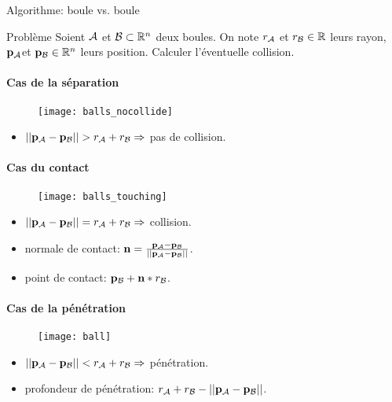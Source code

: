 \begin{frame}{Algorithme: boule vs. boule}
     {
        \begin{block}{Problème}
            Soient $\mathcal{A}$ et $\mathcal{B} \subset \mathbb{R}^n$ deux boules.
            On note $r_{\mathcal{A}}$ et $r_{\mathcal{B}} \in \mathbb{R}$ leurs rayon, ${\bf p_\mathcal{A}}$et ${\bf p_\mathcal{B}} \in
            \mathbb{R}^n$ leurs position.  Calculer l’éventuelle collision.
        \end{block}
    }
     {
     {
        \framesubtitle{Cas de la séparation}
        \begin{figure}[h]
            \texttt{[image: balls\_nocollide]}
        \end{figure}
        \begin{itemize}
            \item $|| {\bf p_\mathcal{A}} - {\bf p_\mathcal{B}} || > r_{\mathcal{A}} + r_{\mathcal{B}} \Rightarrow $ pas de collision.
        \end{itemize}
    }
     {
        \framesubtitle{Cas du contact}
        \begin{figure}[h]
            \texttt{[image: balls\_touching]}
        \end{figure}
        \begin{itemize}
            \item $|| {\bf p_\mathcal{A}} - {\bf p_\mathcal{B}} || = r_{\mathcal{A}} + r_{\mathcal{B}} \Rightarrow $ collision.
            \item normale de contact: ${\bf n} = \frac{{\bf p_\mathcal{A}} - {\bf p_\mathcal{B}}}{|| {\bf p_\mathcal{A}} - {\bf p_\mathcal{B}} ||}$.
            \item point de contact: ${\bf p_\mathcal{B}} + {\bf n} * r_{\mathcal{B}}$.
        \end{itemize}
    }
     {
        \framesubtitle{Cas de la pénétration}
        \begin{figure}[h]
            \texttt{[image: ball]}
        \end{figure}
        \begin{itemize}
            \item $|| {\bf p_\mathcal{A}} - {\bf p_\mathcal{B}} || < r_{\mathcal{A}} + r_{\mathcal{B}} \Rightarrow $ pénétration.\\
            \item profondeur de pénétration: $r_{\mathcal{A}} + r_{\mathcal{B}} - || {\bf p_\mathcal{A}} - {\bf p_\mathcal{B}} ||$.
        \end{itemize}
    }
    }

\end{frame}

